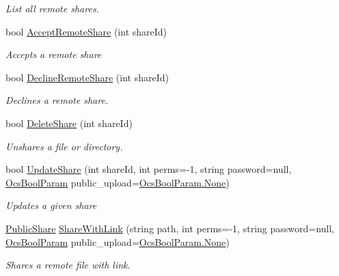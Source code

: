 \begin{DoxyCompactItemize}
\begin{DoxyCompactList}\small\item\em List all remote shares. \end{DoxyCompactList}\item 
bool \hyperlink{classowncloudsharp_1_1_client_ace55eb0544bda9803e493dd80af14970}{Accept\+Remote\+Share} (int share\+Id)
\begin{DoxyCompactList}\small\item\em Accepts a remote share \end{DoxyCompactList}\item 
bool \hyperlink{classowncloudsharp_1_1_client_a8936411abf14870d211e4a62be3d7840}{Decline\+Remote\+Share} (int share\+Id)
\begin{DoxyCompactList}\small\item\em Declines a remote share. \end{DoxyCompactList}\item 
bool \hyperlink{classowncloudsharp_1_1_client_a7499d8f0c4fae0b22da4a35327547cca}{Delete\+Share} (int share\+Id)
\begin{DoxyCompactList}\small\item\em Unshares a file or directory. \end{DoxyCompactList}\item 
bool \hyperlink{classowncloudsharp_1_1_client_a096e6b5540091d8b3f296d899f4807dd}{Update\+Share} (int share\+Id, int perms=-\/1, string password=null, \hyperlink{namespaceowncloudsharp_a7d494b18f174086318df1bdf916068b5}{Ocs\+Bool\+Param} public\+\_\+upload=\hyperlink{namespaceowncloudsharp_a86ba7b86b85c7f5be2304a1ef7ae3157a6adf97f83acf6453d4a6a4b1070f3754}{Ocs\+Bool\+Param.\+None})
\begin{DoxyCompactList}\small\item\em Updates a given share \end{DoxyCompactList}\item 
\hyperlink{classowncloudsharp_1_1_types_1_1_public_share}{Public\+Share} \hyperlink{classowncloudsharp_1_1_client_ac44012d849ddbbbdab86509344d6504d}{Share\+With\+Link} (string path, int perms=-\/1, string password=null, \hyperlink{namespaceowncloudsharp_a7d494b18f174086318df1bdf916068b5}{Ocs\+Bool\+Param} public\+\_\+upload=\hyperlink{namespaceowncloudsharp_a86ba7b86b85c7f5be2304a1ef7ae3157a6adf97f83acf6453d4a6a4b1070f3754}{Ocs\+Bool\+Param.\+None})
\begin{DoxyCompactList}\small\item\em Shares a remote file with link. \end{DoxyCompactList}\item 

\end{DoxyCompactItemize}
